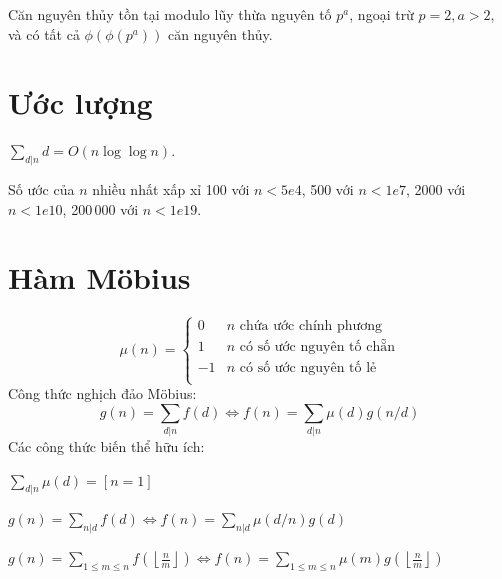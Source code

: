 	Căn nguyên thủy tồn tại modulo lũy thừa nguyên tố $p^a$, ngoại trừ $p = 2, a > 2$, và có tất cả $\phi(\phi(p^a))$ căn nguyên thủy.

\section{Ước lượng}
	$\sum_{d|n} d = O(n \log \log n)$.

	Số ước của $n$ nhiều nhất xấp xỉ 100 với $n < 5e4$, 500 với $n < 1e7$, 2000 với $n < 1e10$, 200\,000 với $n < 1e19$.

\section{Hàm Möbius}
\[
	\mu(n) = \begin{cases} 0 & n \textrm{ chứa ước chính phương}\\ 1 & n \textrm{ có số ước nguyên tố chẵn}\\ -1 & n \textrm{ có số ước nguyên tố lẻ}\\\end{cases}
\]
  Công thức nghịch đảo Möbius:
  \[ g(n) = \sum_{d|n} f(d) \Leftrightarrow f(n) = \sum_{d|n} \mu(d)g(n/d) \]
  Các công thức biến thể hữu ích:

  $ \sum_{d | n} \mu(d) = [ n = 1] $

  $ g(n) = \sum_{n|d} f(d) \Leftrightarrow f(n) = \sum_{n|d} \mu(d/n)g(d)$

  $ g(n) = \sum_{1 \leq m \leq n} f(\left\lfloor\frac{n}{m}\right \rfloor ) \Leftrightarrow f(n) = \sum_{1\leq m\leq n} \mu(m)g(\left\lfloor\frac{n}{m}\right\rfloor)$
